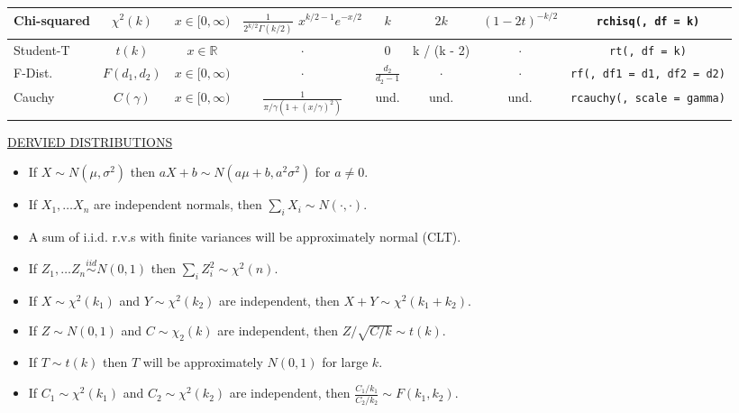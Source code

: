 \documentclass[10pt]{article}
\newcommand{\iid}{\stackrel{iid}{\sim}}
\begin{document}
\begin{center}
\begin{tabular}{l||c|c|c|c|c|c|c}
Chi-squared & $\chi^2(k)$ & $x \in [0, \infty)$ & $\frac{1}{2^{k/2}\Gamma(k/2)}$ $x^{k/2 - 1} e^{-x/2}$ & $k$ & $2k$ & $(1- 2t)^{-k/2}$ & \texttt{rchisq(, df = k)} \\ \hline
Student-T & $t(k)$ & $x \in \mathbb{R}$ & $\cdot$  & 0 & k / (k - 2) & $\cdot$ & \texttt{rt(, df = k)} \\ \hline
F-Dist. & $F(d_1, d_2)$ & $x \in [0, \infty)$ & $\cdot$ & $\frac{d_2}{d_2 - 1}$ & $\cdot$ & $\cdot$ & \texttt{rf(, df1 = d1, df2 = d2)} \\ \hline
Cauchy & $C(\gamma)$ & $x \in [0, \infty)$ & $\frac{1}{\pi/\gamma(1 + (x/\gamma)^2)}$ & und. & und. & und. & \texttt{rcauchy(, scale = gamma)}
\end{tabular}
\end{center}

\noindent
\underline{DERVIED DISTRIBUTIONS}

\begin{multicols}{2}
\begin{itemize}\setlength\itemsep{0em}
    \item If $X \sim N(\mu, \sigma^2)$ then $a X + b \sim N(a\mu + b, a^2 \sigma^2)$ for $a \neq 0$.
    \item If $X_1, \ldots X_n$ are independent normals, then $\sum_i X_i \sim N(\cdot, \cdot)$.
    \item A sum of i.i.d. r.v.s with finite variances will be approximately normal (CLT).
    \item If $Z_1, \ldots Z_n \iid N(0, 1)$ then $\sum_i Z_i^2 \sim \chi^2(n)$.
    \item If $X \sim \chi^2(k_1)$ and $Y \sim \chi^2(k_2)$ are independent, then $X + Y \sim \chi^2(k_1 + k_2)$.
    \item If $Z \sim N(0, 1)$ and $C \sim \chi_2(k)$ are independent, then $Z / \sqrt{C / k} \sim t(k)$.
    \item If $T \sim t(k)$ then $T$ will be approximately $N(0, 1)$ for large $k$.
    \item If $C_1 \sim \chi^2(k_1)$ and $C_2 \sim \chi^2(k_2)$ are independent, then
      $\frac{C_1 / k_1}{C_2 / k_2} \sim F(k_1, k_2)$.
\end{itemize}
\end{multicols}


\end{document}

